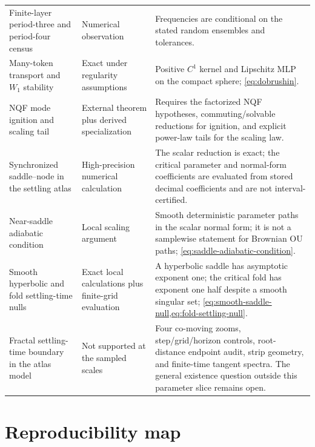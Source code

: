 \documentclass[11pt,a4paper]{article}
\theoremstyle{definition}
\begin{document}
\begin{longtable}{p{}p{}p{}}
Finite-layer period-three and period-four census & Numerical observation & Frequencies
are conditional on the stated random ensembles and tolerances. \\
Many-token transport and $W_1$ stability & Exact under regularity assumptions &
Positive $C^1$ kernel and Lipschitz MLP on the compact sphere; \eqref{eq:dobrushin}. \\
NQF mode ignition and scaling tail & External theorem plus derived specialization &
Requires the factorized NQF hypotheses, commuting/solvable reductions for ignition,
and explicit power-law tails for the scaling law. \\
Synchronized saddle--node in the settling atlas & High-precision numerical
calculation & The scalar reduction is exact; the critical parameter and normal-form
coefficients are evaluated from stored decimal coefficients and are not
interval-certified. \\
Near-saddle adiabatic condition & Local scaling argument & Smooth deterministic
parameter paths in the scalar normal form; it is not a samplewise statement for
Brownian OU paths; \eqref{eq:saddle-adiabatic-condition}. \\
Smooth hyperbolic and fold settling-time nulls & Exact local calculations plus
finite-grid evaluation & A hyperbolic saddle has asymptotic exponent one; the
critical fold has exponent one half despite a smooth singular set;
\cref{eq:smooth-saddle-null,eq:fold-settling-null}. \\
Fractal settling-time boundary in the atlas model & Not supported at the sampled
scales & Four co-moving zooms, step/grid/horizon controls, root-distance endpoint
audit, strip geometry, and finite-time tangent spectra.  The general existence
question outside this parameter slice remains open. \\
\bottomrule
\end{longtable}
\normalsize

\section{Reproducibility map}
\end{document}
